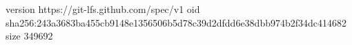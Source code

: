 version https://git-lfs.github.com/spec/v1
oid sha256:243a3683ba455cb9148e1356506b5d78c39d2dfdd6e38dbb974b2f34dc414682
size 349692

